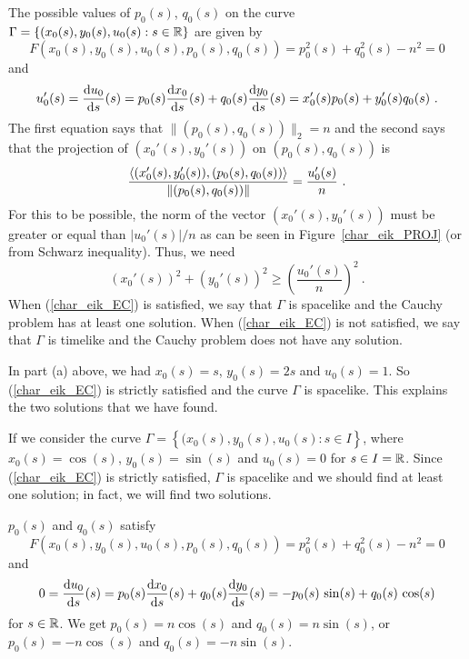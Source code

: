 \begin{egg}
  The possible values of $p_0(s)$, $q_0(s)$ on the curve
$\Gamma = \left\{ (x_0(s), y_0(s), u_0(s) : s \in \mathbb{R}\right\}$ 
are given by
\[
F\left(x_0(s),y_0(s),u_0(s), p_0(s),q_0(s) \right) = p_0^2(s)+q_0^2(s)
- n^2 = 0
\]
and
\[
u_0'(s) = \frac{\mathrm{d}u_0}{\mathrm{d}{s}}(s) = p_0(s)\frac{\mathrm{d}x_0}{\mathrm{d}{s}}(s)+ q_0(s)\frac{\mathrm{d}y_0}{\mathrm{d}{s}}(s)
= x_0'(s) p_0(s) + y_0'(s) q_0(s) \ .
\]
The first equation says that $\displaystyle \|(p_0(s),q_0(s))\|_2 = n$
and the second says that the projection of
$(x_0'(s),y_0'(s))$ on $(p_0(s),q_0(s))$ is
\[
\frac{ \left\langle{(x_0'(s),y_0'(s))} , {(p_0(s),q_0(s))}\right\rangle }{\|(p_0(s),q_0(s))\|}
= \frac{ u_0'(s) }{n} \ .
\]
For this to be possible, the norm of the vector
$(x_0'(s),y_0'(s))$ must be greater or equal than $|u_0'(s)|/n$ as can
be seen in Figure~\ref{char_eik_PROJ} (or from Schwarz inequality).
Thus, we need
\begin{equation} \label{char_eik_EC}
\left(x_0'(s)\right)^2 + \left(y_0'(s)\right)^2
\geq \left(\frac{u_0'(s)}{n}\right)^2 \ .
\end{equation}
When (\ref{char_eik_EC}) is satisfied, we say that $\Gamma$ is
spacelike and the Cauchy problem has at least one solution.  When
(\ref{char_eik_EC}) is not satisfied, we say that $\Gamma$ is timelike
and the Cauchy problem does not have any solution.

In part (a) above, we had $x_0(s) = s$, $y_0(s) = 2s$ and
$u_0(s) = 1$.  So (\ref{char_eik_EC}) is strictly satisfied and the
curve $\Gamma$ is spacelike.  This explains the two
solutions that we have found.


 If we consider the curve
$\Gamma = \left\{ (x_0(s), y_0(s), u_0(s) : s \in I\right\}$, where
$x_0(s)= \cos(s)$, $y_0(s) = \sin(s)$ and $u_0(s)=0$ for $s \in I = \mathbb{R}$.
Since (\ref{char_eik_EC}) is strictly satisfied, $\Gamma$ is spacelike
and we should find at least one solution; in fact, we will find two
solutions.

$p_0(s)$ and $q_0(s)$ satisfy
\[
F\left(x_0(s),y_0(s),u_0(s), p_0(s),q_0(s) \right) = p_0^2(s)+q_0^2(s)
- n^2 = 0
\]
and
\[
0 = \frac{\mathrm{d}u_0}{\mathrm{d}{s}}(s) = p_0(s)\frac{\mathrm{d}x_0}{\mathrm{d}{s}}(s)+ q_0(s)\frac{\mathrm{d}y_0}{\mathrm{d}{s}}(s)
= - p_0(s)\,\sin(s) + q_0(s)\, \cos(s)
\]
for $s \in \mathbb{R}$.  We get $p_0(s) = n\cos(s)$ and $q_0(s) = n\sin(s)$,
or $p_0(s) = -n\cos(s)$ and $q_0(s) = -n\sin(s)$.


\end{egg}
